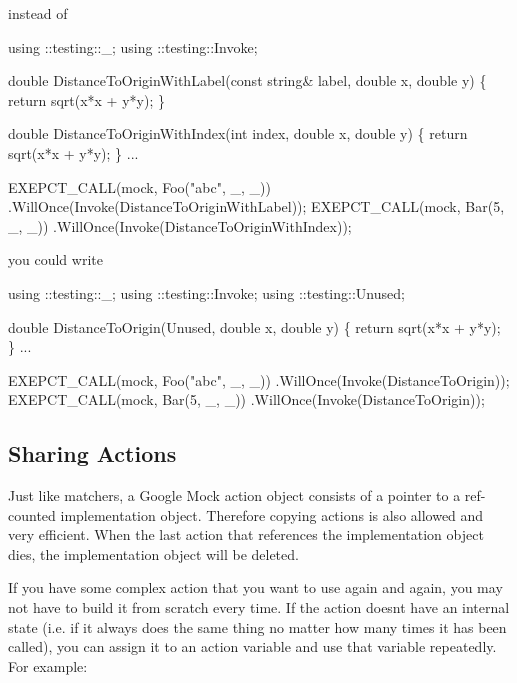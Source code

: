 instead of


\begin{DoxyCode}
using ::testing::\_;
using ::testing::Invoke;

\textcolor{keywordtype}{double} DistanceToOriginWithLabel(\textcolor{keyword}{const} \textcolor{keywordtype}{string}& label, \textcolor{keywordtype}{double} x, \textcolor{keywordtype}{double} y) \{
  \textcolor{keywordflow}{return} sqrt(x*x + y*y);
\}

\textcolor{keywordtype}{double} DistanceToOriginWithIndex(\textcolor{keywordtype}{int} index, \textcolor{keywordtype}{double} x, \textcolor{keywordtype}{double} y) \{
  \textcolor{keywordflow}{return} sqrt(x*x + y*y);
\}
...

  EXEPCT\_CALL(mock, Foo(\textcolor{stringliteral}{"abc"}, \_, \_))
      .WillOnce(Invoke(DistanceToOriginWithLabel));
  EXEPCT\_CALL(mock, Bar(5, \_, \_))
      .WillOnce(Invoke(DistanceToOriginWithIndex));
\end{DoxyCode}


you could write


\begin{DoxyCode}
using ::testing::\_;
using ::testing::Invoke;
using ::testing::Unused;

\textcolor{keywordtype}{double} DistanceToOrigin(Unused, \textcolor{keywordtype}{double} x, \textcolor{keywordtype}{double} y) \{
  \textcolor{keywordflow}{return} sqrt(x*x + y*y);
\}
...

  EXEPCT\_CALL(mock, Foo(\textcolor{stringliteral}{"abc"}, \_, \_))
      .WillOnce(Invoke(DistanceToOrigin));
  EXEPCT\_CALL(mock, Bar(5, \_, \_))
      .WillOnce(Invoke(DistanceToOrigin));
\end{DoxyCode}


\subsection*{Sharing Actions}

Just like matchers, a Google Mock action object consists of a pointer to a ref-\/counted implementation object. Therefore copying actions is also allowed and very efficient. When the last action that references the implementation object dies, the implementation object will be deleted.

If you have some complex action that you want to use again and again, you may not have to build it from scratch every time. If the action doesn\textquotesingle{}t have an internal state (i.\+e. if it always does the same thing no matter how many times it has been called), you can assign it to an action variable and use that variable repeatedly. For example\+:


